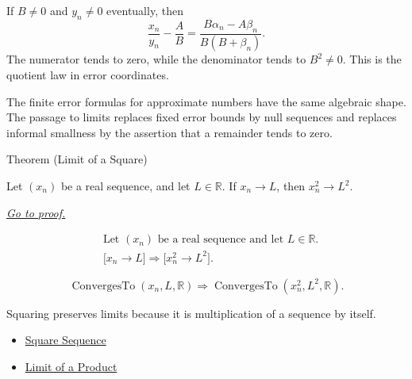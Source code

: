 \begin{example*}[Quotient]
If $B\neq 0$ and $y_n\neq 0$ eventually, then
\[
  \frac{x_n}{y_n}-\frac{A}{B}
  =
  \frac{B\alpha_n-A\beta_n}{B(B+\beta_n)}.
\]
The numerator tends to zero, while the denominator tends to $B^2\neq 0$.
This is the quotient law in error coordinates.
\end{example*}

\begin{remark*}[Interpretation]
The finite error formulas for approximate numbers have the same algebraic
shape. The passage to limits replaces fixed error bounds by null sequences
and replaces informal smallness by the assertion that a remainder tends to
zero.
\end{remark*}


\begin{theorembox}{Theorem (Limit of a Square)}
\begin{theorem}
\label{thm:limit-of-a-square}
Let $(x_n)$ be a real sequence, and let $L\in\mathbb{R}$. If $x_n\to L$,
then $x_n^2\to L^2$.

\smallskip
\noindent
\hyperref[prf:limit-of-a-square]{\textit{Go to proof.}}
\end{theorem}
\end{theorembox}

\begin{remark*}
\[
\begin{aligned}
&\text{Let } (x_n) \text{ be a real sequence and let } L\in\mathbb{R}.\\
&\bigl[x_n\to L\bigr]
\Longrightarrow
\bigl[x_n^2\to L^2\bigr].
\end{aligned}
\]
\end{remark*}

\begin{remark*}
\[
\operatorname{ConvergesTo}(x_n,L,\mathbb{R})
\Longrightarrow
\operatorname{ConvergesTo}(x_n^2,L^2,\mathbb{R}).
\]
\end{remark*}

\begin{remark*}[Interpretation]
Squaring preserves limits because it is multiplication of a sequence by
itself.
\end{remark*}

\begin{dependencies}
\begin{itemize}
  \item \hyperref[def:square-sequence]{Square Sequence}
  \item \hyperref[thm:limit-of-a-product]{Limit of a Product}
\end{itemize}
\end{dependencies}

